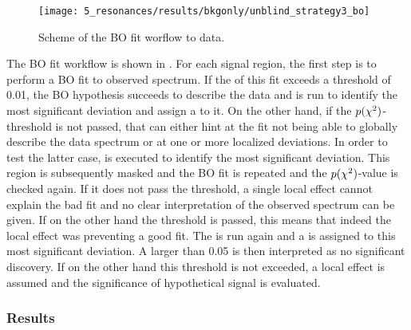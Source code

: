\begin{figure}[ht!]
    \centering
    \texttt{[image: 5\_resonances/results/bkgonly/unblind\_strategy3\_bo]}
    \caption{Scheme of the \ac{BO} fit worflow to data.}
    \label{fig:results:results:bkgonly:strat}
\end{figure}

The \ac{BO} fit workflow is shown in \Fig{\ref{fig:results:results:bkgonly:strat}}. For each signal region, the first step is to perform a \ac{BO} fit to observed \myj spectrum. If the \chisq \pval of this fit exceeds a threshold of 0.01, the \ac{BO} hypothesis succeeds to describe the data and \bh is run to identify the most significant deviation and assign a \pval to it. On the other hand, if the \(p(\chi^{2})\)-threshold is not passed, that can either hint at the fit not being able to globally describe the data spectrum or at one or more localized deviations. In order to test the latter case, \bh is executed to identify the most significant deviation. This region is subsequently masked and the \ac{BO} fit is repeated and the \(p(\chi^{2})\)-value is checked again. If it does not pass the threshold, a single local effect cannot explain the bad fit and no clear interpretation of the observed spectrum can be given. If on the other hand the threshold is passed, this means that indeed the local effect was preventing a good fit. The \bh is run again and a \pval is assigned to this most significant deviation. A \pval larger than 0.05 is then interpreted as no significant \bh discovery. If on the other hand this threshold is not exceeded, a local effect is assumed and the significance of hypothetical signal is evaluated.

\subsubsection{Results}

